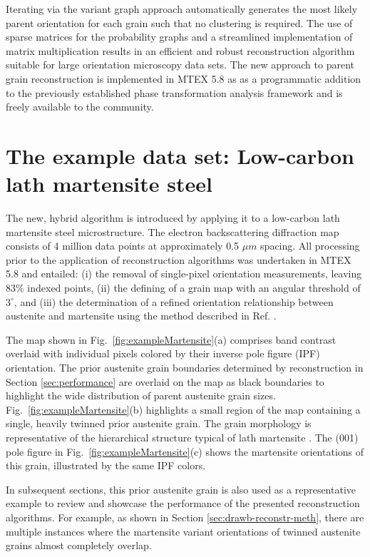 \documentclass{elsarticle}
\numberwithin{equation}{section}
\begin{document}
Iterating via the variant graph approach automatically generates the most likely parent orientation for each grain such that no clustering is required. The use of sparse matrices for the probability graphs and a streamlined implementation of matrix multiplication results in an efficient and robust reconstruction algorithm suitable for large orientation microscopy data sets. The new approach to parent grain reconstruction is implemented in MTEX 5.8 as as a programmatic addition to the previously established phase transformation analysis framework \cite{Niessen2021b} and is freely available to the community.


\section{The example data set: Low-carbon lath martensite steel}
The new, hybrid algorithm is introduced by applying it to a low-carbon lath martensite steel microstructure. The electron backscattering diffraction map consists of 4 million data points at approximately 0.5 $\mu m$ spacing. All processing prior to the application of reconstruction algorithms was undertaken in MTEX 5.8 \cite{BaHiSc10} and entailed: (i) the removal of single-pixel orientation measurements, leaving $83\%$ indexed points, (ii) the defining of a grain map with an angular threshold of $3^{\circ}$, and (iii) the determination of a refined orientation relationship between austenite and martensite using the method described in Ref. \cite{NyIsPeKu16}.

The map shown in Fig.~\ref{fig:exampleMartensite}(a) comprises band contrast overlaid with individual pixels colored by their inverse pole figure (IPF) orientation. The prior austenite grain boundaries determined by reconstruction in Section \ref{sec:performance} are overlaid on the map as black boundaries to highlight the wide distribution of parent austenite grain sizes. Fig.~\ref{fig:exampleMartensite}(b) highlights a small region of the map containing a single, heavily twinned prior austenite grain. The grain morphology is representative of the hierarchical structure typical of lath martensite \cite{Morito2003}. The (001) pole figure in Fig.~\ref{fig:exampleMartensite}(c) shows the martensite orientations of this grain, illustrated by the same IPF colors.

In subsequent sections, this prior austenite grain is also used as a representative example to review and showcase the performance of the presented reconstruction algorithms. For example, as shown in Section \ref{sec:drawb-reconstr-meth}, there are multiple instances where the martensite variant orientations of twinned austenite grains almost completely overlap. 
\end{document}
